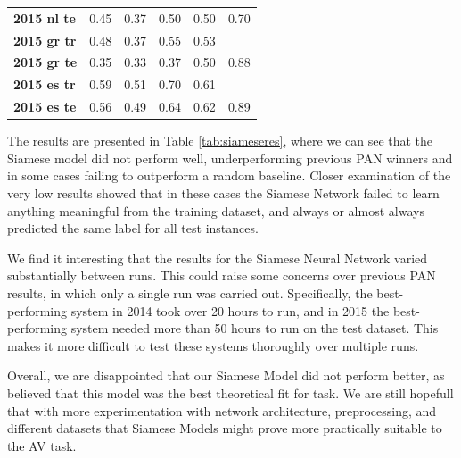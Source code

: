 \begin{table}[ht]
\begin{center}
\begin{tabular}{lrrrrr}
\bf 2015 nl te             &   0.45     & 0.37        &  0.50    &  0.50  &   0.70  \\
\bf 2015 gr tr             &   0.48     & 0.37        &  0.55    &  0.53  &         \\
\bf 2015 gr te             &   0.35     & 0.33        &  0.37    &  0.50  &    0.88 \\
\bf 2015 es tr             &   0.59     & 0.51        &  0.70    &  0.61  &         \\
\bf 2015 es te             &   0.56     & 0.49        &  0.64    &  0.62  &    0.89 \\
\bottomrule
\end{tabular}
\end{center}
\end{table}

The results are presented in Table \ref{tab:siameseres}, where we can see that the Siamese model did not perform well, underperforming previous PAN winners and in some cases failing to outperform a random baseline. Closer examination of the very low results showed that in these cases the Siamese Network failed to learn anything meaningful from the training dataset, and always or almost always predicted the same label for all test instances. 

We find it interesting that the results for the Siamese Neural Network varied substantially between runs. This could raise some concerns over previous PAN results, in which only a single run was carried out. 
Specifically, the best-performing system in 2014 took over 20 hours to run, and in 2015 the best-performing system needed more than 50 hours to run on the test dataset. This makes it more difficult to test these systems thoroughly over multiple runs.

Overall, we are disappointed that our Siamese Model did not perform better, as believed that this model was the best theoretical fit for task. We are still hopefull that with more experimentation with network architecture, preprocessing, and different datasets that Siamese Models might prove more practically suitable to the AV task.

